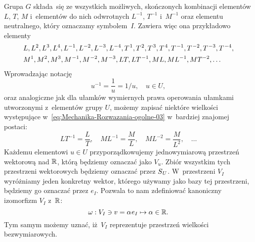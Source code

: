 \documentclass[a4paper,11pt]{article}
\numberwithin{equation}{section}
\begin{document}
Grupa $G$ składa~się ze wszystkich możliwych, skończonych kombinacji
elementów $L$, $T$, $M$ i~elementów do nich odwrotnych $L^{ -1 }$, $T^{ -1 }$
i~$M^{ -1 }$ oraz elementu neutralnego, który oznaczamy symbolem~$I$.
Zawiera więc ona przykładowo elementy
\begin{equation}
  \label{eq:Mechanika-Rozwazania-ogolne-03}
  \begin{split}
    &L, L^{ 2 }, L^{ 3 }, L^{ 4 }, L^{ -1 }, L^{ -2 }, L^{ -3 }, L^{ -4 },
      T^{ \hspace{0.07em} 1 }, T^{ \hspace{0.07em} 2 }, T^{ \hspace{0.07em} 3 },
      T^{ \hspace{0.09em} 4 }, T^{ \hspace{0.07em} -1 }, T^{ \hspace{0.07em} -2 },
      T^{ \hspace{0.07em} -3 }, T^{ \hspace{0.07em} -4 }, \\
    &M^{ 1 }, M^{ 2 }, M^{ 3 }, M^{ \hspace{0.05em} -1 }, M^{ \hspace{0.05em} -2 },
      M^{ \hspace{0.05em} -3 }, L T, L T^{ \hspace{0.07em} -1 }, M L, M L^{ -1 },
      M T^{ -2 }, \ldots
  \end{split}
\end{equation}
Wprowadzając notację
\begin{equation}
  \label{eq:Mechanika-Rozwazania-ogolne-04}
  u^{ -1 } = \frac{ 1 }{ u } = 1 / u, \quad u \in U,
\end{equation}
oraz analogiczne jak dla ułamków wymiernych prawa operowania ułamkami
utworzonymi z~elementów grupy $U$, możemy zapisać niektóre wielkości
występujące w~\eqref{eq:Mechanika-Rozwazania-ogolne-03} w~bardziej znajomej
postaci:
\begin{equation}
  \label{eq:Mechanika-Rozwazania-ogolne-05}
  L T^{ -1 } = \frac{ L }{ T }, \quad
  M L^{ -1 } = \frac{ M }{ L }, \quad
  M L^{ -2 } = \frac{ M }{ L^{ 2 } }, \quad \ldots
\end{equation}
Każdemu elementowi $u \in U$ przyporządkowujemy jednowymiarową przestrzeń
wektorową nad $\mathbb{R}$, którą będziemy oznaczać jako $V_{ u }$. Zbiór
wszystkim tych przestrzeni wektorowych będziemy oznaczać przez
$S_{ \hspace{0.05em} U }$. W~przestrzeni $V_{ I }$ wyróżniamy jeden konkretny
wektor, którego używamy jako bazy tej przestrzeni, będziemy go oznaczać
przez $e_{ I }$. Pozwala to nam zdefiniować kanoniczny izomorfizm $V_{ I }$
z~$\mathbb{R}$:
\begin{equation}
  \label{eq:Mechanika-Rozwazania-ogolne-06}
  \omega : V_{ I } \ni v = \alpha \hspace{0.05em} e_{ I } \mapsto \alpha \in \mathbb{R}.
\end{equation}
Tym samym możemy uznać, iż~$V_{ I }$ reprezentuje przestrzeń wielkości
bezwymiarowych.
\end{document}
